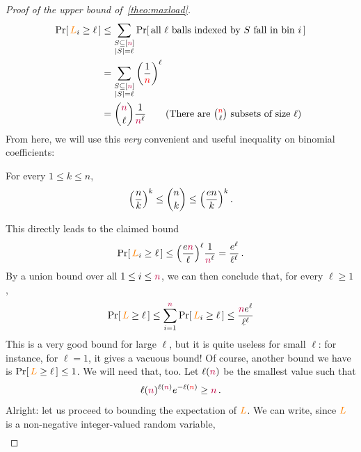 \begin{proof}[Proof of the upper bound of~\cref{theo:maxload}]
\begin{align*}
    \probaOf{\orange{L}_i \geq \ell} 
    &\leq
    \sum_{\substack{S\subseteq [\nbins]\\ |S| = \ell}} \probaOf{\text{all }\ell \text{ balls indexed by } S \text{ fall in bin } i} \\
    &=  \sum_{\substack{S\subseteq [\nbins]\\ |S| = \ell}} \left(\frac{1}{\ns}\right)^\ell \\
    &= \binom{\nbins}{\ell}\frac{1}{\nbins^{\ell}} \tag{There are $\binom{\ns}{\ell}$ subsets of size $\ell$}
\end{align*}
From here, we will use this \emph{very} convenient and useful inequality on binomial coefficients:
\begin{fact}
    \label{fact:binom:coeffs}
    For every $1\leq k\leq n$,
    \[
        \Paren{\frac{n}{k}}^k 
        \leq \binom{n}{k} 
        \leq \Paren{\frac{e n}{k}}^k\,.
    \]
\end{fact}
\noindent This directly leads to the claimed bound
\[
    \probaOf{\orange{L}_i \geq \ell} 
    \leq \Paren{\frac{e \nbins}{\ell}}^{\ell}\frac{1}{\nbins^{\ell}} 
    = \frac{e^\ell}{\ell^\ell}\,.
\]
By a union bound over all $1\leq i\leq \textcolor{purple}{n}$, we can then conclude that, for every $\ell \geq 1$,
\begin{equation}
    \probaOf{\orange{L} \geq \ell} \leq \sum_{i=1}^{\nbins}\probaOf{\orange{L}_i \geq \ell}
    \leq \frac{\nbins e^\ell}{\ell^\ell}
\end{equation}
This is a very good bound for large $\ell$, but it is quite useless for small $\ell$: for instance, for $\ell=1$, it gives a vacuous bound! Of course, another bound we have is $\probaOf{\orange{L} \geq \ell}  \leq 1$. We will need that, too. Let $\ell(\textcolor{purple}{n})$ be the smallest value such that
\begin{equation}
    \ell(\textcolor{purple}{n})^{\ell(\textcolor{purple}{n})}e^{-\ell({\textcolor{red}{n}})} \geq \textcolor{purple}{n}\,.
\end{equation}
Alright: let us proceed to bounding the expectation of $\textcolor{orange}{L}$. We can write, since $\textcolor{orange}{L}$ is a non-negative integer-valued random variable,
\begin{align}

\end{align}
\end{proof}
